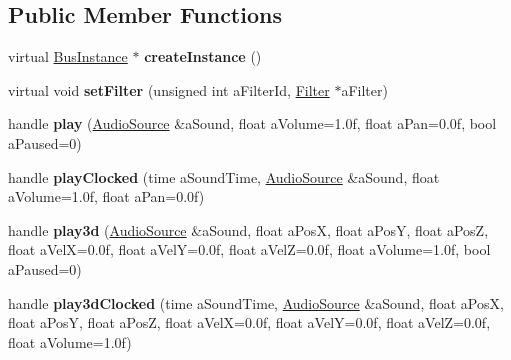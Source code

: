 \subsection*{Public Member Functions}
\begin{DoxyCompactItemize}
\item 
\mbox{\label{class_so_loud_1_1_bus_a46f89ce122e732a105382d01415dcf15}} 
virtual \mbox{\hyperlink{class_so_loud_1_1_bus_instance}{Bus\+Instance}} $\ast$ {\bfseries create\+Instance} ()
\item 
\mbox{\label{class_so_loud_1_1_bus_adc155188e09e9d5bebe0b151815b3ac0}} 
virtual void {\bfseries set\+Filter} (unsigned int a\+Filter\+Id, \mbox{\hyperlink{class_so_loud_1_1_filter}{Filter}} $\ast$a\+Filter)
\item 
\mbox{\label{class_so_loud_1_1_bus_a9fed9a7b746fda44b9212471c9a2f4d4}} 
handle {\bfseries play} (\mbox{\hyperlink{class_so_loud_1_1_audio_source}{Audio\+Source}} \&a\+Sound, float a\+Volume=1.\+0f, float a\+Pan=0.\+0f, bool a\+Paused=0)
\item 
\mbox{\label{class_so_loud_1_1_bus_ad42e5cb151a2eececa8fb5e7d14a7669}} 
handle {\bfseries play\+Clocked} (time a\+Sound\+Time, \mbox{\hyperlink{class_so_loud_1_1_audio_source}{Audio\+Source}} \&a\+Sound, float a\+Volume=1.\+0f, float a\+Pan=0.\+0f)
\item 
\mbox{\label{class_so_loud_1_1_bus_a3469af79377fcf6d803351f81a3c9e58}} 
handle {\bfseries play3d} (\mbox{\hyperlink{class_so_loud_1_1_audio_source}{Audio\+Source}} \&a\+Sound, float a\+PosX, float a\+PosY, float a\+PosZ, float a\+VelX=0.\+0f, float a\+Vel\+Y=0.\+0f, float a\+Vel\+Z=0.\+0f, float a\+Volume=1.\+0f, bool a\+Paused=0)
\item 
\mbox{\label{class_so_loud_1_1_bus_ab660cf763eb4a68be97d7539d6893952}} 
handle {\bfseries play3d\+Clocked} (time a\+Sound\+Time, \mbox{\hyperlink{class_so_loud_1_1_audio_source}{Audio\+Source}} \&a\+Sound, float a\+PosX, float a\+PosY, float a\+PosZ, float a\+VelX=0.\+0f, float a\+Vel\+Y=0.\+0f, float a\+Vel\+Z=0.\+0f, float a\+Volume=1.\+0f)
\item 
\mbox{\label{class_so_loud_1_1_bus_a3981391bb38f3356fdb329124c398750}} 

\end{DoxyCompactItemize}
